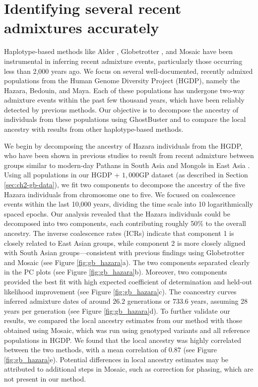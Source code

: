 \clearpage

\section{Identifying several recent admixtures accurately}
\label{sec:ch2-gb-real}

Haplotype-based methods like Alder \cite{loh2013inferring}, Globetrotter \cite{hellenthal2014genetic}, and Mosaic \cite{salter2019fine} have been instrumental in inferring recent admixture events, particularly those occurring less than 2,000 years ago. We focus on several well-documented, recently admixed populations from the Human Genome Diversity Project (HGDP), namely the Hazara, Bedouin, and Maya. Each of these populations has undergone two-way admixture events within the past few thousand years, which have been reliably detected by previous methods. Our objective is to decompose the ancestry of individuals from these populations using GhostBuster and to compare the local ancestry with results from other haplotype-based methods.

We begin by decomposing the ancestry of Hazara individuals from the HGDP, who have been shown in previous studies to result from recent admixture between groups similar to modern-day Pathans in South Asia and Mongols in East Asia \cite{hellenthal2014genetic,salter2019fine}. Using all populations in our HGDP + $1{,}000$GP dataset (as described in Section \ref{sec:ch2-gb-data}), we fit two components to decompose the ancestry of the five Hazara individuals from chromosome one to five. We focused on coalescence events within the last 10,000 years, dividing the time scale into 10 logarithmically spaced epochs. Our analysis revealed that the Hazara individuals could be decomposed into two components, each contributing roughly 50\% to the overall ancestry. The inverse coalescence rates (ICRs) indicate that component 1 is closely related to East Asian groups, while component 2 is more closely aligned with South Asian groups—consistent with previous findings using Globetrotter and Mosaic (see Figure \ref{fig:gb_hazara}a). The two components separated clearly in the PC plots (see Figure \ref{fig:gb_hazara}b). Moreover, two components provided the best fit with high expected coefficient of determination and held-out likelihood improvement (see Figure \ref{fig:gb_hazara}c). The coancestry curves inferred admixture dates of around $26.2$ generations or $733.6$ years, assuming 28 years per generation (see Figure \ref{fig:gb_hazara}d). To further validate our results, we compared the local ancestry estimates from our method with those obtained using Mosaic, which was run using genotyped variants and all reference populations in HGDP. We found that the local ancestry was highly correlated between the two methods, with a mean correlation of $0.87$ (see Figure \ref{fig:gb_hazara}e). Potential differences in local ancestry estimates may be attributed to additional steps in Mosaic, such as correction for phasing, which are not present in our method.

